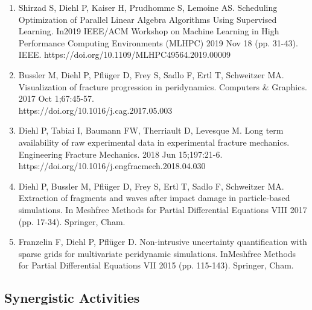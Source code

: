 \documentclass[svgnames,11pt]{article}
\begin{document}
\begin{enumerate}
    \item Shirzad S, Diehl P, Kaiser H, Prudhomme S, Lemoine AS. Scheduling Optimization of Parallel Linear Algebra Algorithms Using Supervised Learning. In2019 IEEE/ACM Workshop on Machine Learning in High Performance Computing Environments (MLHPC) 2019 Nov 18 (pp. 31-43). IEEE. https://doi.org/10.1109/MLHPC49564.2019.00009
    \item Bussler M, Diehl P, Pfl\"uger D, Frey S, Sadlo F, Ertl T, Schweitzer MA. Visualization of fracture progression in peridynamics. Computers \& Graphics. 2017 Oct 1;67:45-57.\\ https://doi.org/10.1016/j.cag.2017.05.003 
    \item Diehl P, Tabiai I, Baumann FW, Therriault D, Levesque M. Long term availability of raw experimental data in experimental fracture mechanics. Engineering Fracture Mechanics. 2018 Jun 15;197:21-6. https://doi.org/10.1016/j.engfracmech.2018.04.030
    \item Diehl P, Bussler M, Pfl\"uger D, Frey S, Ertl T, Sadlo F, Schweitzer MA. Extraction of fragments and waves after impact damage in particle-based simulations. In Meshfree Methods for Partial Differential Equations VIII 2017 (pp. 17-34). Springer, Cham.
    \item Franzelin F, Diehl P, Pflüger D. Non-intrusive uncertainty quantification with sparse grids for multivariate peridynamic simulations. InMeshfree Methods for Partial Differential Equations VII 2015 (pp. 115-143). Springer, Cham.
\end{enumerate}

\subsection{Synergistic Activities}
\end{document}
